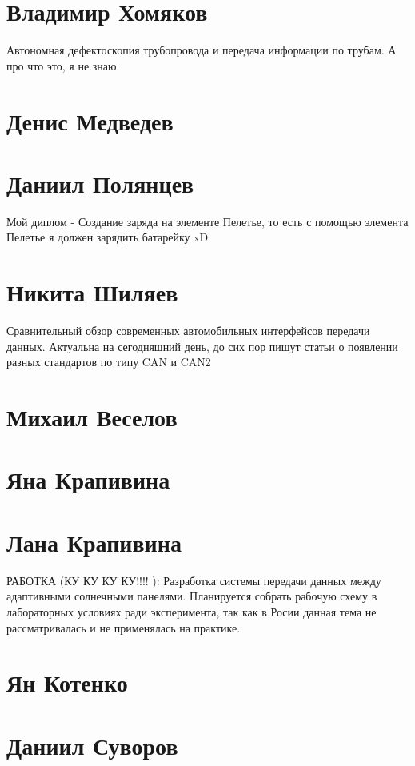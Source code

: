 \documentclass{article}
\begin{document}
\section*{Владимир Хомяков} 
Автономная дефектоскопия трубопровода и передача информации по трубам. А про что это, я не знаю.

\section*{Денис Медведев}

\section*{Даниил Полянцев}
Мой диплом - Создание заряда на элементе Пелетье, то есть с помощью элемента Пелетье я должен зарядить батарейку xD

\section*{Никита Шиляев}

Сравнительный обзор современных автомобильных интерфейсов передачи данных. Актуальна на сегодняшний день, до сих пор пишут статьи о появлении разных стандартов по типу CAN и CAN2

\section*{Михаил Веселов}

\section*{Яна Крапивина}

\section*{Лана Крапивина}
РАБОТКА (КУ КУ КУ КУ!!!! ): Разработка системы передачи данных между адаптивными солнечными панелями. Планируется собрать рабочую схему в лабораторных условиях ради эксперимента, так как в Росии данная тема не рассматривалась и не применялась на практике.

\section*{Ян Котенко}

\section*{Даниил Суворов}
\end{document}
